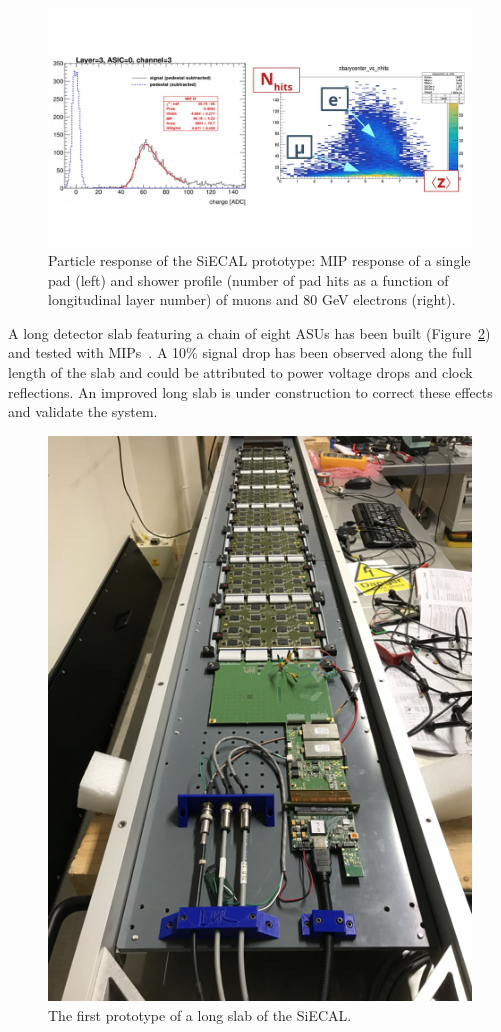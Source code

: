 \begin{figure}[t!]
\centering
\includegraphics[width=1.0\hsize]{Detector/fig/SiWECAL_signals.jpg}
\caption{Particle response of the SiECAL prototype: MIP response of a single pad (left) and shower profile (number of pad hits as a function of longitudinal layer number) of muons and 80 GeV electrons (right).}
\label{fig:det:SiWECAL_signals}
\end{figure}



A long detector slab featuring a chain of eight ASUs has been built (Figure~\ref{fig:det:siw-longslab}) and tested with MIPs~\cite{Magniette:2019nyg}. 
A 10\% signal drop has been observed along the full length of the slab and could be attributed to power voltage drops and clock reflections. An improved long slab is under construction to correct these effects and validate the system. 

\begin{figure}[t!]
\centering
\includegraphics[width=0.32\hsize,angle=90]{Detector/fig/siwecal-longslab.png}
\caption{The first prototype of a long slab of the SiECAL.}
\label{fig:det:siw-longslab}
\end{figure}


